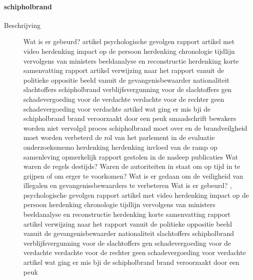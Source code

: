 \paragraph{schipholbrand}

\begin{description}
\item[Beschrijving]

Wat is er gebeurd?
\cite{schipholbrand27102005video}
artikel
\cite{schipholbrand27102005video}
psychologische gevolgen
rapport
\cite{onderzoeksraad2610schipholoost}
artikel met video
herdenking
impact op de persoon
herdenking
\cite{schipholbrandvideoargos}
chronologie
\cite{nunl30052023feitenoverzicht}
tijdlijn
vervolgens van ministers
beeldanalyse en reconstructie
\cite{}
herdenking
korte samenvatting
rapport
artikel
verwijzing naar het rapport vanuit de politieke oppositie
beeld vanuit de gevangenisbewaarder
nationaliteit slachtoffers schipholbrand
verblijfsvergunning voor de slachtoffers
gen schadevergoeding voor de verdachte
verdachte voor de rechter
geen schadevergoeding voor verdachte
artikel wat ging er mis bji de schipholbrand
brand veroorzaakt door een peuk
smaadschrift
bewakers worden niet vervolgd
proces schipholbrand moet over en de brandveilgheid moet worden verbeterd
de rol van het parlement in de evaluatie
\cite{parlementairemonitorschipholbrand}
onderzoeksmemo
herdenking
herdenking
invloed van de ramp op samenleving
\cite{videonpoNOVA13112008}
opmerkelijk rapport gestolen in de nasleep
\cite{rizoomes01052014schipholbrand}
publicaties
\cite{heuvelkroesschipholbrandcamerabeelden}
Wat waren de regels destijds?
Waren de autoriteiten in staat om op tijd in te grijpen of om erger te voorkomen?
Wat is er gedaan om de veiligheid van illegalen en gevangenissbewaarders te verbeteren
Wat is er gebeurd?
\cite{wikiSchipholbrand},\cite{schipholbrand27102005video}
psychologische gevolgen
rapport
\cite{onderzoeksraad2610schipholoost}
artikel met video
herdenking
impact op de persoon
herdenking
\cite{schipholbrandvideoargos}
chronologie
\cite{nunl30052023feitenoverzicht}
tijdlijn
\cite{singeluitgeverijenSchipholbrand}
vervolgens van ministers
beeldanalyse en reconstructie
\cite{eenvandaagschipholbrand}
herdenking
korte samenvatting
rapport
artikel
verwijzing naar het rapport vanuit de politieke oppositie
beeld vanuit de gevangenisbewaarder
nationaliteit slachtoffers schipholbrand
verblijfsvergunning voor de slachtoffers
gen schadevergoeding voor de verdachte
verdachte voor de rechter
geen schadevergoeding voor verdachte
artikel wat ging er mis bji de schipholbrand
brand veroorzaakt door een peuk

\end{description}
